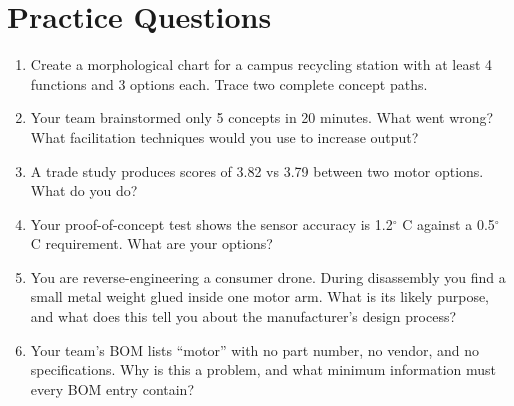 \documentclass[11pt,letterpaper,twoside,openany]{book}
\begin{document}
\section{Practice Questions}
\begin{enumerate}[leftmargin=1.5em]
\item Create a morphological chart for a campus recycling station with at least 4 functions and 3 options each. Trace two complete concept paths.
\item Your team brainstormed only 5 concepts in 20 minutes. What went wrong? What facilitation techniques would you use to increase output?
\item A trade study produces scores of 3.82 vs 3.79 between two motor options. What do you do?
\item Your proof-of-concept test shows the sensor accuracy is 1.2$^{\circ}$ C against a 0.5$^{\circ}$ C requirement. What are your options?
\item You are reverse-engineering a consumer drone. During disassembly you find a small metal weight glued inside one motor arm. What is its likely purpose, and what does this tell you about the manufacturer's design process?
\item Your team's BOM lists ``motor'' with no part number, no vendor, and no specifications. Why is this a problem, and what minimum information must every BOM entry contain?
\end{enumerate}
\end{document}
